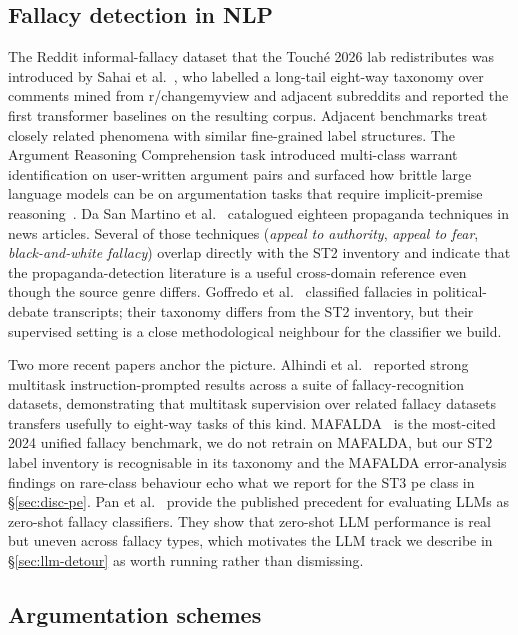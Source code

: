\subsection{Fallacy detection in NLP}
\label{sec:bg-fallacy}

The Reddit informal-fallacy dataset that the Touch\'{e} 2026 lab redistributes was introduced by Sahai et al.~\cite{sahai2021invisiblewall}, who labelled a long-tail eight-way taxonomy over comments mined from r/changemyview and adjacent subreddits and reported the first transformer baselines on the resulting corpus. Adjacent benchmarks treat closely related phenomena with similar fine-grained label structures. The Argument Reasoning Comprehension task introduced multi-class warrant identification on user-written argument pairs and surfaced how brittle large language models can be on argumentation tasks that require implicit-premise reasoning~\cite{habernal2018arc}. Da San Martino et al.~\cite{dasanmartino2019propaganda} catalogued eighteen propaganda techniques in news articles. Several of those techniques (\emph{appeal to authority}, \emph{appeal to fear}, \emph{black-and-white fallacy}) overlap directly with the ST2 inventory and indicate that the propaganda-detection literature is a useful cross-domain reference even though the source genre differs. Goffredo et al.~\cite{goffredo2022political} classified fallacies in political-debate transcripts; their taxonomy differs from the ST2 inventory, but their supervised setting is a close methodological neighbour for the classifier we build.

Two more recent papers anchor the picture. Alhindi et al.~\cite{alhindi2022multitask} reported strong multitask instruction-prompted results across a suite of fallacy-recognition datasets, demonstrating that multitask supervision over related fallacy datasets transfers usefully to eight-way tasks of this kind. MAFALDA~\cite{helwe2024mafalda} is the most-cited 2024 unified fallacy benchmark, we do not retrain on MAFALDA, but our ST2 label inventory is recognisable in its taxonomy and the MAFALDA error-analysis findings on rare-class behaviour echo what we report for the ST3 \textsf{pe} class in \S\ref{sec:disc-pe}. Pan et al.~\cite{pan2024zeroshotfallacy} provide the published precedent for evaluating LLMs as zero-shot fallacy classifiers. They show that zero-shot LLM performance is real but uneven across fallacy types, which motivates the LLM track we describe in \S\ref{sec:llm-detour} as worth running rather than dismissing.

\subsection{Argumentation schemes}
\label{sec:bg-schemes}

